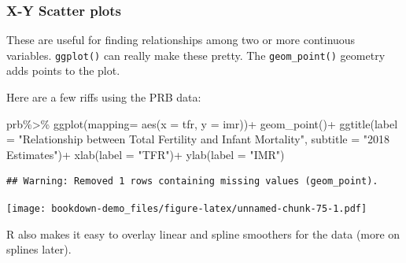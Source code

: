 \documentclass[
]{article}
\newenvironment{Shaded}{\begin{snugshade}}{\end{snugshade}}
\newcommand{\AttributeTok}[1]{\textcolor[rgb]{0.77,0.63,0.00}{#1}}
\newcommand{\FunctionTok}[1]{\textcolor[rgb]{0.00,0.00,0.00}{#1}}
\newcommand{\NormalTok}[1]{#1}
\newcommand{\SpecialCharTok}[1]{\textcolor[rgb]{0.00,0.00,0.00}{#1}}
\newcommand{\StringTok}[1]{\textcolor[rgb]{0.31,0.60,0.02}{#1}}
\begin{document}
\hypertarget{x-y-scatter-plots}{%
\subsubsection{X-Y Scatter plots}\label{x-y-scatter-plots}}

These are useful for finding relationships among two or more continuous
variables. \texttt{ggplot()} can really make these pretty. The \texttt{geom\_point()}
geometry adds points to the plot.

Here are a few riffs using the PRB data:

\begin{Shaded}
\begin{Highlighting}[]
\NormalTok{prb}\SpecialCharTok{\%\textgreater{}\%}
\FunctionTok{ggplot}\NormalTok{(}\AttributeTok{mapping=} \FunctionTok{aes}\NormalTok{(}\AttributeTok{x =}\NormalTok{ tfr,}
                    \AttributeTok{y =}\NormalTok{ imr))}\SpecialCharTok{+}
  \FunctionTok{geom\_point}\NormalTok{()}\SpecialCharTok{+}
  \FunctionTok{ggtitle}\NormalTok{(}\AttributeTok{label =} \StringTok{"Relationship between Total Fertility and Infant Mortality"}\NormalTok{,}
          \AttributeTok{subtitle =} \StringTok{"2018 Estimates"}\NormalTok{)}\SpecialCharTok{+}
  \FunctionTok{xlab}\NormalTok{(}\AttributeTok{label =} \StringTok{"TFR"}\NormalTok{)}\SpecialCharTok{+}
  \FunctionTok{ylab}\NormalTok{(}\AttributeTok{label =} \StringTok{"IMR"}\NormalTok{)}
\end{Highlighting}
\end{Shaded}

\begin{verbatim}
## Warning: Removed 1 rows containing missing values (geom_point).
\end{verbatim}

\texttt{[image: bookdown-demo\_files/figure-latex/unnamed-chunk-75-1.pdf]}

R also makes it easy to overlay linear and spline smoothers for the data
(more on splines later).
\end{document}
